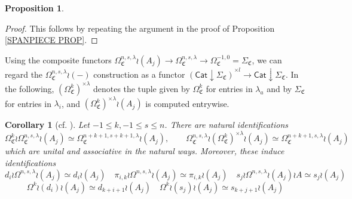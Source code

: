 \documentclass[a4paper,10pt
]{article}%
\numberwithin{equation}{section}
\numberwithin{figure}{section}
\newtheorem{proposition}[equation]{Proposition}%
\newtheorem{corollary}[equation]{Corollary}%
\theoremstyle{definition} %
\newcommand{\1}{\ensuremath{\mathbbm 1}}%
\newcommand{\OC}{\Omega_{\mathfrak C}}
\begin{document}
\begin{proposition}
\end{proposition}



\begin{proof}
	This follows by repeating the argument in the proof of Proposition \ref{SPANPIECE PROP}.
\end{proof}



Using the composite functors
$\Omega_{\mathfrak{C}}^{n,s,\lambda} \wr (A_j)
\to \Omega_{\mathfrak{C}}^{n,s,\lambda} 
\to \Omega^{-1,0}_{\mathfrak{C}} = \Sigma_{\mathfrak{C}}$,
we can regard the 
$\Omega_{\mathfrak{C}}^{n,s,\lambda} \wr (-)$
construction as a functor
$\left(\mathsf{Cat}\downarrow \Sigma_{\mathfrak{C}}\right)^{\times l}
\to \mathsf{Cat}\downarrow \Sigma_{\mathfrak{C}}$.
%
In the following, 
$(\OC^k)^{\times \lambda}$
denotes the tuple given by 
$\OC^k$ for entries in $\lambda_a$ and by
$\Sigma_{\mathfrak{C}}$ for entries in $\lambda_i$,
and $(\OC^k)^{\times \lambda} \wr (A_j)$ is computed entrywise.

\begin{corollary}[{cf. \cite[Cor. 5.35]{BP21}}]
	\label{LABIDEN_COR}
	Let $-1 \leq k, -1 \leq s \leq n$.
	There are natural identifications
	\[
	\OC^k \wr \OC^{n,s,\lambda} \wr (A_j) \simeq
	\OC^{n+k+1,s+k+1,\lambda} \wr (A_j),
	\qquad
	\OC^{n,s,\lambda} \wr (\OC^k)^{\times \lambda} \wr (A_j) \simeq
	\OC^{n+k+1,s,\lambda} \wr (A_j)	
	\]
	which are unital and associative in the natural ways.
	Moreover, these induce identifications
	\[
	d_i \wr \Omega^{n,s,\lambda} \wr (A_j) \simeq d_i \wr (A_j)
	\quad
	\pi_{i,k} \wr \Omega^{n,s,\lambda} \wr (A_j) \simeq \pi_{i,k} \wr (A_j)
	\quad
	s_j \wr \Omega^{n,s,\lambda} \wr (A_j) \wr A \simeq s_j \wr  (A_j)
	\]
	\[
	\Omega^k \wr (d_i) \wr (A_j) \simeq d_{k+i+1} \wr (A_j)
	\quad
	\Omega^k \wr (s_j) \wr (A_j) \simeq s_{k+j+1} \wr (A_j)
	\]
\end{corollary}
\end{document}
